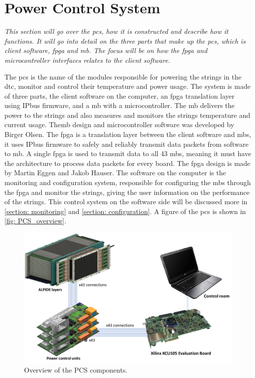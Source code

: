\documentclass[main.tex]{subfiles}
\begin{document}
\section{Power Control System}

\textit{This section will go over the \gls{pcs}, how it is constructed and describe how it functions. It will go into detail on the three parts that make up the \gls{pcs}, which is client software, \gls{fpga} and \gls{mb}. The focus will be on how the \gls{fpga} and microcontroller interfaces relates to the client software.}

The \acrfull{pcs} is the name of the modules responsible for powering the strings in the \gls{dtc}, monitor and control their temperature and power usage. The system is made of three parts, the client software on the computer, an \gls{fpga} translation layer using IPbus firmware, and a \acrlong{mb} with a microcontroller. The \gls{mb} delivers the power to the strings and also measures and monitors the strings temperature and current usage. The\gls{mb} design and microcontroller software was developed by Birger Olsen. The \gls{fpga} is a translation layer between the client software and \gls{mb}s, it uses IPbus firmware to safely and reliably transmit data packets from software to \gls{mb}. A single \gls{fpga} is used to transmit data to all 43 \gls{mb}s, meaning it must have the architecture to process data packets for every board. The \gls{fpga} design is made by Martin Eggen and Jakob Hauser. The software on the computer is the monitoring and configuration system, responsible for configuring the \gls{mb}s through the \gls{fpga} and monitor the strings, giving the user information on the performance of the strings. This control system on the software side will be discussed more in \autoref{section: monitoring} and \autoref{section: configuration}. A figure of the \gls{pcs} is shown in \autoref{fig: PCS_overview}.  

\begin{figure}[!htpb]
    \centering
    \includegraphics[width=15cm]{images/PowerDeliverySystemOverview.png}
    \caption{Overview of the PCS components.}
    \label{fig: PCS_overview}
\end{figure}
\FloatBarrier
\end{document}
